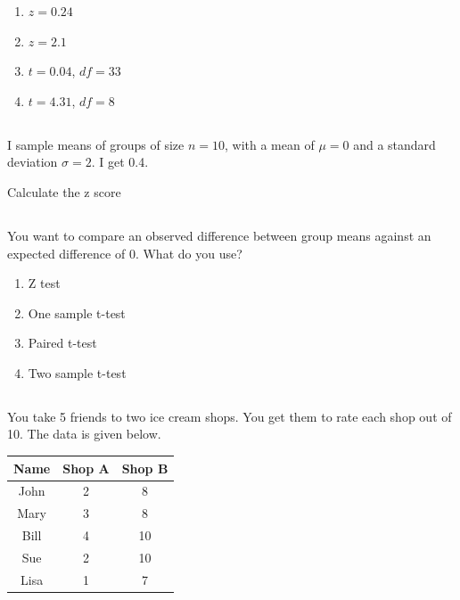 \documentclass[twocolumn]{article}
\begin{document}
\begin{enumerate}
    \item $z = 0.24 $
    \item $z = 2.1 $
    \item $t = 0.04$, $df = 33$
    \item $t = 4.31$, $df = 8$
\end{enumerate}

\subsection{}

I sample means of groups of size $n = 10$, with a mean of $\mu = 0$ and a standard deviation $\sigma = 2$. I get 0.4.

Calculate the z score

\subsection{}

You want to compare an observed difference between group means against an expected difference of 0. What do you use?

\begin{enumerate}
    \item Z test
    \item One sample t-test
    \item Paired t-test
    \item Two sample t-test
\end{enumerate}

\subsection{}

You take 5 friends to two ice cream shops. You get them to rate each shop out of 10. The data is given below.

\begin{table}[h!]
    \centering
    \begin{tabular}{c | c | c }
        \toprule
        Name & Shop A & Shop B \\
        \midrule
        John & 2 & 8  \\
        Mary & 3 & 8  \\
        Bill & 4 & 10 \\
        Sue & 2 & 10 \\
        Lisa & 1 & 7 \\
        \bottomrule
    \end{tabular}
\end{table}
\end{document}
